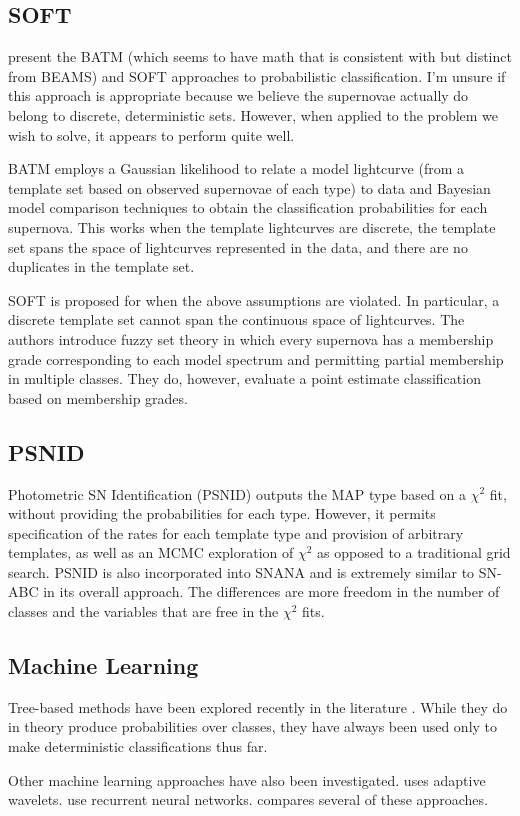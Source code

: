 \documentclass[12pt, onecolumn]{emulateapj}
\begin{document}
\subsection{SOFT}

\citep{Rodney09, Rodney10} present the BATM (which seems to have math that is consistent with but distinct from BEAMS) and SOFT approaches to probabilistic classification.  I'm unsure if this approach is appropriate because we believe the supernovae actually do belong to discrete, deterministic sets.  However, when applied to the problem we wish to solve, it appears to perform quite well.

BATM employs a Gaussian likelihood to relate a model lightcurve (from a template set based on observed supernovae of each type) to data and Bayesian model comparison techniques to obtain the classification probabilities for each supernova.  This works when the template lightcurves are discrete, the template set spans the space of lightcurves represented in the data, and there are no duplicates in the template set.  

SOFT is proposed for when the above assumptions are violated.  In particular, a discrete template set cannot span the continuous space of lightcurves.  The authors introduce fuzzy set theory in which every supernova has a membership grade corresponding to each model spectrum and permitting partial membership in multiple classes.  They do, however, evaluate a point estimate classification based on membership grades.

\subsection{PSNID}

Photometric SN Identification (PSNID) \citep{Sako11} outputs the MAP type based on a $\chi^{2}$ fit, without providing the probabilities for each type.  However, it permits specification of the rates for each template type and provision of arbitrary templates, as well as an MCMC exploration of $\chi^{2}$ as opposed to a traditional grid search.  PSNID is also incorporated into SNANA and is extremely similar to SN-ABC in its overall approach.  The differences are more freedom in the number of classes and the variables that are free in the $\chi^{2}$ fits.

\subsection{Machine Learning}

Tree-based methods have been explored recently in the literature \citep{Richards11, Lochner16, Moller16}.  While they do in theory produce probabilities over classes, they have always been used only to make deterministic classifications thus far.  

Other machine learning approaches have also been investigated.  \citet{Varughese15} uses adaptive wavelets.  \citet{Karpenka12, Charnock16} use recurrent neural networks.  \citet{Lochner16} compares several of these approaches.




\end{document}
